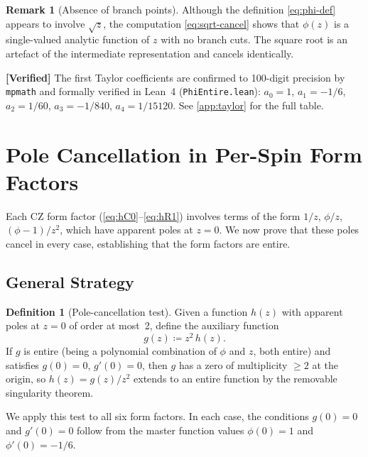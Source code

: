\documentclass[11pt,a4paper]{article}
\theoremstyle{plain}
\theoremstyle{definition}
\newtheorem{definition}[theorem]{Definition}
\newtheorem{remark}[theorem]{Remark}
\newcommand{\verified}[1]{%
  \par\smallskip\noindent
  \colorbox{green!10}{\parbox{\dimexpr\linewidth-2\fboxsep}{%
    \textcolor{green!50!black}{\textbf{[Verified]}} #1}}%
  \par\smallskip}
\begin{document}
\begin{remark}[Absence of branch points]
Although the definition \cref{eq:phi-def} appears to involve $\sqrt{z}$,
the computation \cref{eq:sqrt-cancel} shows that $\phi(z)$ is a single-valued
analytic function of $z$ with no branch cuts. The square root is an artefact
of the intermediate representation and cancels identically.
\end{remark}

\verified{The first Taylor coefficients are confirmed to 100-digit
precision by \texttt{mpmath} and formally verified in Lean~4
(\texttt{PhiEntire.lean}):
$a_0 = 1$, $a_1 = -1/6$, $a_2 = 1/60$, $a_3 = -1/840$,
$a_4 = 1/15120$. See \cref{app:taylor} for the full table.}

\section{Pole Cancellation in Per-Spin Form Factors}\label{sec:poles}

Each CZ form factor (\cref{eq:hC0}--\cref{eq:hR1}) involves terms
of the form $1/z$, $\phi/z$, $(\phi-1)/z^2$, which have apparent
poles at $z = 0$. We now prove that these poles cancel in every case,
establishing that the form factors are entire.

\subsection{General Strategy}

\begin{definition}[Pole-cancellation test]\label{def:pole-test}
Given a function $h(z)$ with apparent poles at $z = 0$ of order
at most~2, define the auxiliary function
\begin{equation}
  g(z) \coloneqq z^2\, h(z).
\end{equation}
If $g$ is entire (being a polynomial combination of $\phi$ and $z$,
both entire) and satisfies $g(0) = 0$, $g'(0) = 0$, then $g$ has a
zero of multiplicity $\geq 2$ at the origin, so
$h(z) = g(z)/z^2$ extends to an entire function by the removable
singularity theorem.
\end{definition}

We apply this test to all six form factors. In each case, the conditions
$g(0) = 0$ and $g'(0) = 0$ follow from the master function values
$\phi(0) = 1$ and $\phi'(0) = -1/6$.
\end{document}
